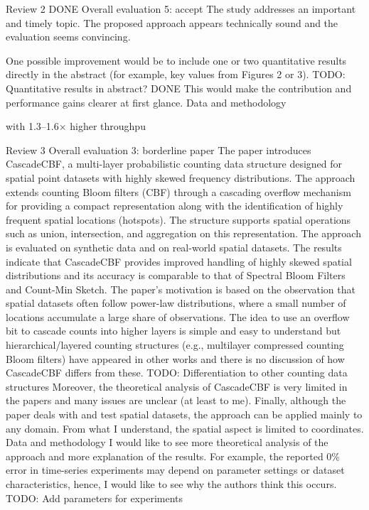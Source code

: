 Review 2 DONE
Overall evaluation	
5: accept
The study addresses an important and timely topic. The proposed approach appears technically sound and the evaluation seems convincing.

One possible improvement would be to include one or two quantitative results directly in the abstract (for example, key values from Figures 2 or 3). 
TODO: Quantitative results in abstract? DONE
This would make the contribution and performance gains clearer at first glance.
Data and methodology	

 with 1.3–1.6× higher throughpu

Review 3
Overall evaluation	
3: borderline paper
The paper introduces CascadeCBF, a multi-layer probabilistic counting data structure designed for spatial point datasets with highly skewed frequency distributions. The approach extends counting Bloom filters (CBF) through a cascading overflow mechanism for providing a compact representation along with the identification of highly frequent spatial locations (hotspots). The structure supports spatial operations such as union, intersection, and aggregation on this representation. The approach is evaluated on synthetic data and on real-world spatial datasets. The results indicate that CascadeCBF provides improved handling of highly skewed spatial distributions and its accuracy is comparable to that of Spectral Bloom Filters and Count-Min Sketch.
The paper's motivation is based on the observation that spatial datasets often follow power-law distributions, where a small number of locations accumulate a large share of observations. The idea to use an overflow bit to cascade counts into higher layers is simple and easy to understand but hierarchical/layered counting structures (e.g., multilayer compressed counting Bloom filters) have appeared in other works and there is no discussion of how CascadeCBF differs from these. 
TODO: Differentiation to other counting data structures
Moreover, the theoretical analysis of CascadeCBF is very limited in the papers and many issues are unclear (at least to me). Finally, although the paper deals with and test spatial datasets, the approach can be applied mainly to any domain. From what I understand, the spatial aspect is limited to coordinates.
Data and methodology	I would like to see more theoretical analysis of the approach and more explanation of the results. For example, the reported 0\% error in time-series experiments may depend on parameter settings or dataset characteristics, hence, I would like to see why the authors think this occurs.
TODO: Add parameters for experiments


